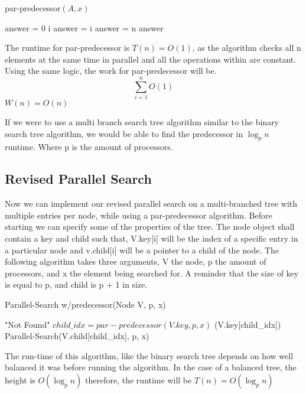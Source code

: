 \documentclass[11pt]{article}
\begin{document}
\begin{algorithm}
\caption{par-predecessor$(A,x)$}
\begin{algorithmic}
\STATE answer = 0
    	\RETURN i
    	\STATE answer = i
	\ENDIF
    	\STATE answer = n
	\ENDIF
	\RETURN answer
\ENDFOR
\end{algorithmic}
\end{algorithm}

The runtime for par-predecessor is $T(n) = O(1)$, as the algorithm checks all n elements at the same time in parallel and all the operations within are constant.
Using the same logic, the work for par-predecessor will be. $$\sum_{i=1}^{n}O(1)$$
$W(n) = O(n)$

If we were to use a multi branch search tree algorithm similar to the binary search tree algorithm, we would be able to find the predecessor in $\log_p n$ runtime. Where p is the amount of processors.


\subsection{Revised Parallel Search}

Now we can implement our revised parallel search on a multi-branched tree with multiple entries per node, while using a par-predecessor algorithm. Before starting we can specify some of the properties of the tree. The node object shall contain a key and child such that, V.key[i] will be the index of a specific entry in a particular node and v.child[i] will be a pointer to a child of the node. The following algorithm takes three arguments, V the node, p the amount of processors, and x the element being searched for. A reminder that the size of key is equal to p, and child is p + 1 in size.

\begin{algorithm}
\caption{Parallel-Search w/predecessor(Node V, p, x)}
\begin{algorithmic}
	\RETURN "Not Found"
\ENDIF
\STATE $child\_idx = par-predecessor(V.key, p, x)$
	\RETURN (V.key[child\_idx])
\ELSE
	\RETURN Parallel-Search(V.child[child\_idx], p, x)
\ENDIF
\end{algorithmic}
\end{algorithm}

The run-time of this algorithm, like the binary search tree depends on how well balanced it was before running the algorithm. In the case of a balanced tree, the height is $O(\log_p n)$ therefore, the runtime will be  $T(n) = O(\log_p n)$ 


%

\end{document}
